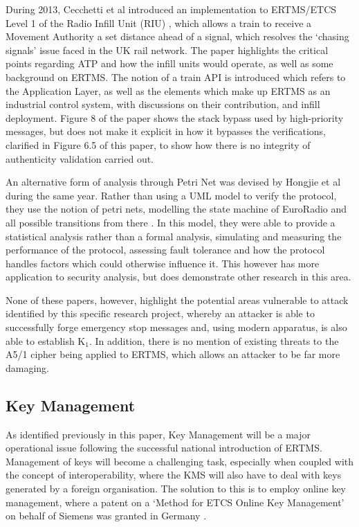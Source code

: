 \documentclass[twoside,11pt,a4paper]{article}
\begin{document}
During 2013, Cecchetti et al introduced an implementation to ERTMS/ETCS Level 1 of the Radio Infill Unit (RIU) \citep{Cecchetti13a}, which allows a train to receive a Movement Authority a set distance ahead of a signal, which resolves the `chasing signals' issue faced in the UK rail network. The paper highlights the critical points regarding ATP and how the infill units would operate, as well as some background on ERTMS. The notion of a train API is introduced which refers to the Application Layer, as well as the elements which make up ERTMS as an industrial control system, with discussions on their contribution, and infill deployment. Figure 8 of the paper shows the stack bypass used by high-priority messages, but does not make it explicit in how it bypasses the verifications, clarified in Figure 6.5 of this paper, to show how there is no integrity of authenticity validation carried out.

An alternative form of analysis through Petri Net was devised by Hongjie et al during the same year. Rather than using a UML model to verify the protocol, they use the notion of petri nets, modelling the state machine of EuroRadio and all possible transitions from there \citep{Hongjie13a}. In this model, they were able to provide a statistical analysis rather than a formal analysis, simulating and measuring the performance of the protocol, assessing fault tolerance and how the protocol handles factors which could otherwise influence it. This however has more application to security analysis, but does demonstrate other research in this area.

None of these papers, however, highlight the potential areas vulnerable to attack identified by this specific research project, whereby an attacker is able to successfully forge emergency stop messages and, using modern apparatus, is also able to establish K$_1$. In addition, there is no mention of existing threats to the A5/1 cipher being applied to ERTMS, which allows an attacker to be far more damaging.

\subsection{Key Management}
As identified previously in this paper, Key Management will be a major operational issue following the successful national introduction of ERTMS. Management of keys will become a challenging task, especially when coupled with the concept of interoperability, where the KMS will also have to deal with keys generated by a foreign organisation. The solution to this is to employ online key management, where a patent on a `Method for ETCS Online Key Management' on behalf of Siemens was granted in Germany \citep{SiemensPatent}. 
\end{document}
